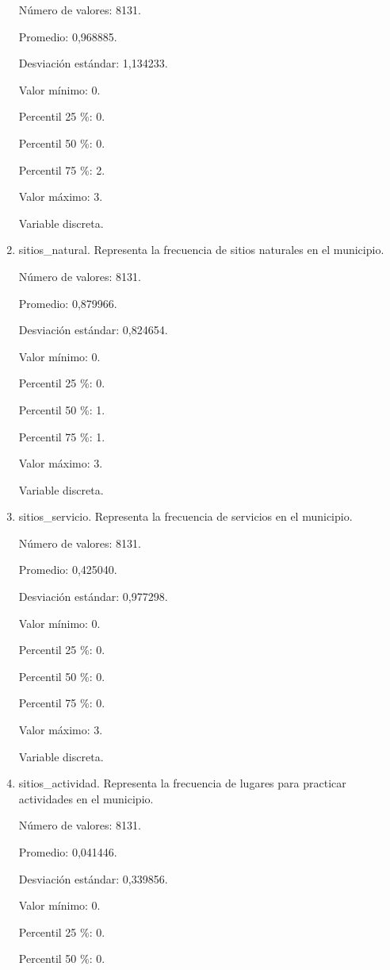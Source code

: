 \begin{enumerate}
	Número de valores: 8131.
	
	Promedio: 0,968885.
	
	Desviación estándar: 1,134233.
	
	Valor mínimo: 0.
	
	Percentil 25 \%: 0.
	
	Percentil 50 \%: 0.
	
	Percentil 75 \%: 2.
	
	Valor máximo: 3.
	
	Variable discreta.

	\item sitios\_natural. Representa la frecuencia de sitios naturales en el municipio.
	
	Número de valores: 8131.
	
	Promedio: 0,879966.
	
	Desviación estándar: 0,824654.
	
	Valor mínimo: 0.
	
	Percentil 25 \%: 0.
	
	Percentil 50 \%: 1.
	
	Percentil 75 \%: 1.
	
	Valor máximo: 3.
	
	Variable discreta.

	\item sitios\_servicio. Representa la frecuencia de servicios en el municipio.
	
	Número de valores: 8131.
	
	Promedio: 0,425040.
	
	Desviación estándar: 0,977298.
	
	Valor mínimo: 0.
	
	Percentil 25 \%: 0.
	
	Percentil 50 \%: 0.
	
	Percentil 75 \%: 0.
	
	Valor máximo: 3.
	
	Variable discreta.

	\item sitios\_actividad. Representa la frecuencia de lugares para practicar actividades en el municipio.
	
	Número de valores: 8131.
	
	Promedio: 0,041446.
	
	Desviación estándar: 0,339856.
	
	Valor mínimo: 0.
	
	Percentil 25 \%: 0.
	
	Percentil 50 \%: 0.
	

\end{enumerate}
